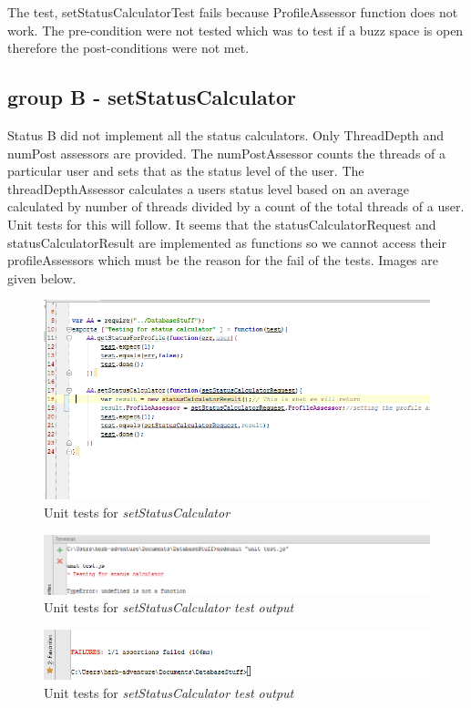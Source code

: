 \documentclass[a4paper,12pt]{article}
\begin{document}
The test, setStatusCalculatorTest fails because ProfileAssessor function does not work. The pre-condition were not tested which was to test if a buzz space is open therefore the post-conditions were not met.

\subsection{group B - setStatusCalculator}
Status B did not implement all the status calculators. Only ThreadDepth and numPost assessors are provided. The numPostAssessor counts the threads of a particular user and sets that as the status level of the user. The threadDepthAssessor calculates a users status level based on an average calculated by number of threads divided by a count of the total threads of a user. Unit tests for this will follow.
It seems that the statusCalculatorRequest and statusCalculatorResult are implemented as functions so we cannot access their profileAssessors which must be the reason for the fail of the tests. Images are given below.

	\begin{figure}
		\includegraphics[width=1.0\textwidth]{Figures/codes.PNG}
		\caption{Unit tests for \textit{setStatusCalculator}}
	\end{figure}

	\begin{figure}
		\includegraphics[width=1.0\textwidth]{Figures/statuscalculator.PNG}
		\caption{Unit tests for \textit{setStatusCalculator test output}}
	\end{figure}
	\begin{figure}
		\includegraphics[width=1.0\textwidth]{Figures/statuscalculator2.PNG}
		\caption{Unit tests for \textit{setStatusCalculator test output}}
	\end{figure}
\end{document}
